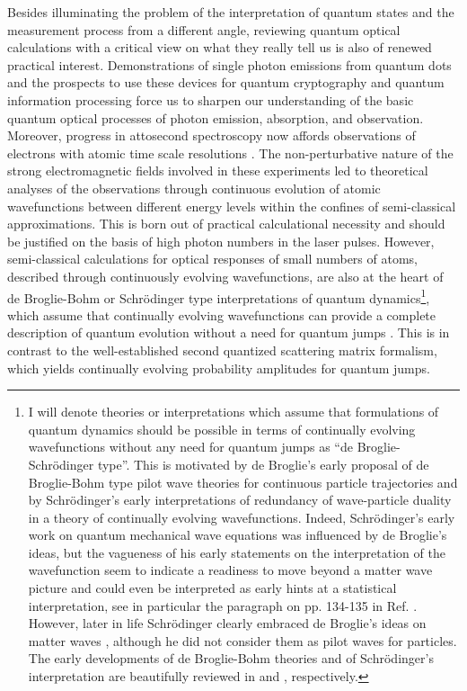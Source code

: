 \documentclass[final,3p,times,twocolumn]{elsarticle3}
\begin{document}
Besides illuminating the problem of the interpretation of quantum states and 
the measurement process from a different angle, reviewing quantum optical 
calculations with a critical view on what they really tell us is also of 
renewed practical interest. Demonstrations of single photon emissions from 
quantum dots \cite{1pem1,1pem2,1pem3} and the prospects to use these 
devices for quantum cryptography and quantum information processing force us 
to sharpen our understanding of the basic quantum optical processes of photon 
emission, absorption, and observation. Moreover, progress in attosecond 
spectroscopy \cite{atto1,atto2} now affords observations of electrons with 
atomic time scale resolutions \cite{atom1,atom2,atom3,atom4,atom5}.
The non-perturbative nature of the strong electromagnetic fields involved in
these experiments led to theoretical analyses of the observations through 
continuous evolution of atomic wavefunctions between different energy levels
within the confines of semi-classical approximations. This is born out of
practical calculational necessity and should be justified on the basis of high 
photon numbers in the laser pulses. However, semi-classical calculations for
optical responses of small numbers of atoms, described through continuously
evolving wavefunctions, are also at the heart of de Broglie-Bohm or 
Schr\"odinger type interpretations of quantum dynamics\footnote{I will denote 
theories or interpretations which assume that formulations of quantum dynamics 
should be possible in terms of continually evolving wavefunctions without any 
need for quantum jumps as ``de Broglie-Schr\"odinger type''. This is motivated 
by de Broglie's early proposal of de Broglie-Bohm type pilot wave theories for 
continuous particle trajectories and by Schr\"odinger's early interpretations 
of redundancy of wave-particle duality in a theory of continually evolving 
wavefunctions. Indeed, Schr\"odinger's early work on quantum mechanical wave 
equations was influenced by de Broglie's ideas, but the vagueness of his early 
statements on the interpretation of the wavefunction seem to indicate a readiness 
to move beyond a matter wave picture and could even be interpreted as early hints 
at a statistical interpretation, see in particular the paragraph on pp. 134-135 
in Ref. \cite{erwin}. However, later in life Schr\"odinger clearly embraced de 
Broglie's ideas on matter waves \cite{erwin2,erwin3}, although he 
did not consider them as pilot waves for particles. The early developments of 
de Broglie-Bohm theories and of Schr\"odinger's interpretation are beautifully 
reviewed in \cite{Holland} and \cite{perovic}, respectively.}, which assume that 
continually evolving wavefunctions can provide a complete description of quantum 
evolution without a need for quantum jumps \cite{erwin2,erwin3}. 
This is in contrast to the well-established second quantized scattering 
matrix formalism, which yields continually evolving probability amplitudes for 
quantum jumps.
\end{document}
